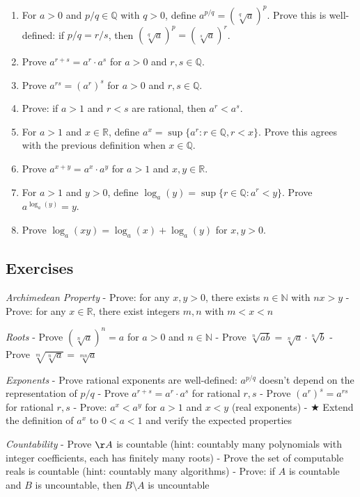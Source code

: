 \documentclass[
  10pt,
  letterpaper,
]{scrbook}
\newcommand{\NN}{\mathbb{N}}
\newcommand{\QQ}{\mathbb{Q}}
\newcommand{\RR}{\mathbb{R}}
\begin{document}
\begin{enumerate}
\def\labelenumi{(\alph{enumi})}
\item
  For \(a > 0\) and \(p/q \in \QQ\) with \(q > 0\), define
  \(a^{p/q} = (\sqrt[q]{a})^p\). Prove this is well-defined: if
  \(p/q = r/s\), then \((\sqrt[q]{a})^p = (\sqrt[s]{a})^r\).
\item
  Prove \(a^{r+s} = a^r \cdot a^s\) for \(a > 0\) and \(r, s \in \QQ\).
\item
  Prove \(a^{rs} = (a^r)^s\) for \(a > 0\) and \(r, s \in \QQ\).
\item
  Prove: if \(a > 1\) and \(r < s\) are rational, then \(a^r < a^s\).
\item
  For \(a > 1\) and \(x \in \RR\), define
  \(a^x = \sup\{a^r : r \in \QQ, r < x\}\). Prove this agrees with the
  previous definition when \(x \in \QQ\).
\item
  Prove \(a^{x+y} = a^x \cdot a^y\) for \(a > 1\) and \(x, y \in \RR\).
\item
  For \(a > 1\) and \(y > 0\), define
  \(\log_a(y) = \sup\{r \in \QQ : a^r < y\}\). Prove
  \(a^{\log_a(y)} = y\).
\item
  Prove \(\log_a(xy) = \log_a(x) + \log_a(y)\) for \(x, y > 0\).
\end{enumerate}

\subsection{Exercises}\label{exercises-3}

\emph{Archimedean Property} - Prove: for any \(x, y > 0\), there exists
\(n \in \NN\) with \(nx > y\) - Prove: for any \(x \in \RR\), there
exist integers \(m, n\) with \(m < x < n\)

\emph{Roots} - Prove \((\sqrt[n]{a})^n = a\) for \(a > 0\) and
\(n \in \NN\) - Prove \(\sqrt[n]{ab} = \sqrt[n]{a} \cdot \sqrt[n]{b}\) -
Prove \(\sqrt[m]{\sqrt[n]{a}} = \sqrt[mn]{a}\)

\emph{Exponents} - Prove rational exponents are well-defined:
\(a^{p/q}\) doesn't depend on the representation of \(p/q\) - Prove
\(a^{r+s} = a^r \cdot a^s\) for rational \(r, s\) - Prove
\((a^r)^s = a^{rs}\) for rational \(r, s\) - Prove: \(a^x < a^y\) for
\(a > 1\) and \(x < y\) (real exponents) - ★ Extend the definition of
\(a^x\) to \(0 < a < 1\) and verify the expected properties

\emph{Countability} - Prove \(\AA\) is countable (hint: countably many
polynomials with integer coefficients, each has finitely many roots) -
Prove the set of computable reals is countable (hint: countably many
algorithms) - Prove: if \(A\) is countable and \(B\) is uncountable,
then \(B \setminus A\) is uncountable
\end{document}
